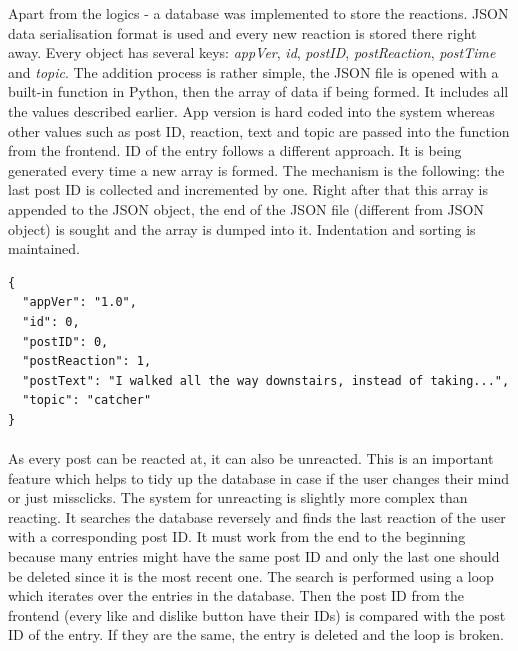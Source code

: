 \documentclass[12pt]{report}
\newenvironment{code}{\captionsetup{type=listing}}{}
\begin{document}
Apart from the logics - a database was implemented to store the reactions. JSON data serialisation format is used 
and every new reaction is stored there right away. Every object has several keys: \textit{appVer}, \textit{id},
\textit{postID}, \textit{postReaction}, \textit{postTime} and \textit{topic}. The addition process is rather simple,
the JSON file is opened with a built-in function in Python, then the array of data if being formed. It includes all
the values described earlier. App version is hard coded into the system whereas other values such as post ID, reaction,
text and topic are passed into the function from the frontend. ID of the entry follows a different approach. It is 
being generated every time a new array is formed. The mechanism is the following: the last post ID is collected and
incremented by one. Right after that this array is appended to the JSON object, the end of the JSON file (different from JSON object) 
is sought and the array is dumped into it. Indentation and sorting is maintained.

\begin{code}
\begin{verbatim}
{
  "appVer": "1.0",
  "id": 0,
  "postID": 0,
  "postReaction": 1,
  "postText": "I walked all the way downstairs, instead of taking...",
  "topic": "catcher"
}
\end{verbatim}
\end{code}

\paragraph*{}
As every post can be reacted at, it can also be unreacted. This is an important feature which helps to tidy up the
database in case if the user changes their mind or just missclicks. The system for unreacting is slightly more
complex than reacting. It searches the database reversely and finds the last reaction of the user with a corresponding
post ID. It must work from the end to the beginning because many entries might have the same post ID and only the last
one should be deleted since it is the most recent one. The search is performed using a loop which iterates over the
entries in the database. Then the post ID from the frontend (every like and dislike button have their IDs) is compared
with the post ID of the entry. If they are the same, the entry is deleted and the loop is broken.
\end{document}
